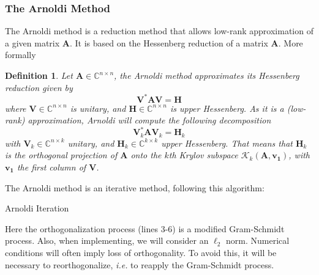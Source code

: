 \documentclass[11pt]{article}
\newtheorem{definition}{Definition}[section]
\numberwithin{equation}{section}
\begin{document}
\subsubsection{The Arnoldi Method}
The Arnoldi method is a reduction method that allows low-rank approximation of a given matrix $\mathbf{A}$. It is based on the Hessenberg reduction of a matrix $\mathbf{A}$. More formally
\begin{definition}
    Let $\mathbf{A}\in\mathbb{C}^{n\times n}$, the Arnoldi method approximates its Hessenberg reduction given by
    \begin{equation}
        \mathbf{V}^*\mathbf{A}\mathbf{V} = \mathbf{H}
    \end{equation}
    where $\mathbf{V}\in\mathbb{C}^{n\times n}$ is unitary, and $\mathbf{H}\in\mathbb{C}^{n\times n}$ is upper Hessenberg. As it is a (low-rank) approximation, Arnoldi will compute the following decomposition
    \begin{equation}
        \mathbf{V}_k^*\mathbf{A}\mathbf{V}_k = \mathbf{H}_k
    \end{equation}
    with $\mathbf{V}_k\in\mathbb{C}^{n\times k}$ unitary, and $\mathbf{H}_k\in\mathbb{C}^{k\times k}$ upper Hessenberg. That means that $\mathbf{H}_k$ is the orthogonal projection of $\mathbf{A}$ onto the $k$th Krylov subspace $\mathcal{K}_k(\mathbf{A},\mathbf{v_1})$, with $\mathbf{v_1}$ the first column of $\mathbf{V}$.
\end{definition}
The Arnoldi method is an iterative method, following this algorithm:
\begin{algorithm2e}
    \SetAlgoLined
    \caption{Arnoldi Iteration}
    \label{alg:arnoldi}
\end{algorithm2e}

Here the orthogonalization process (lines 3-6) is a modified Gram-Schmidt process. Also, when implementing, we will consider an $\ell_2$ norm. Numerical conditions will often imply loss of orthogonality. To avoid this, it will be necessary to reorthogonalize, \textit{i.e.} to reapply the Gram-Schmidt process.
\end{document}
